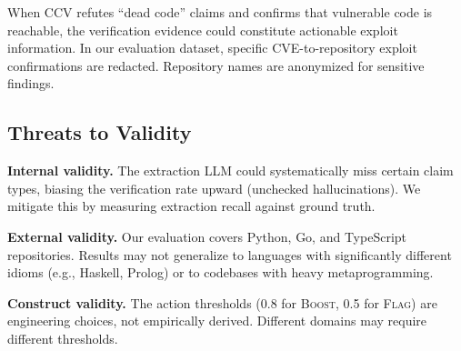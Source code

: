 When CCV refutes ``dead code'' claims and confirms that vulnerable code is reachable, the verification evidence could constitute actionable exploit information. In our evaluation dataset, specific CVE-to-repository exploit confirmations are redacted. Repository names are anonymized for sensitive findings.

\subsection{Threats to Validity}

\textbf{Internal validity.} The extraction LLM could systematically miss certain claim types, biasing the verification rate upward (unchecked hallucinations). We mitigate this by measuring extraction recall against ground truth.

\textbf{External validity.} Our evaluation covers Python, Go, and TypeScript repositories. Results may not generalize to languages with significantly different idioms (e.g., Haskell, Prolog) or to codebases with heavy metaprogramming.

\textbf{Construct validity.} The action thresholds (0.8 for \textsc{Boost}, 0.5 for \textsc{Flag}) are engineering choices, not empirically derived. Different domains may require different thresholds.
